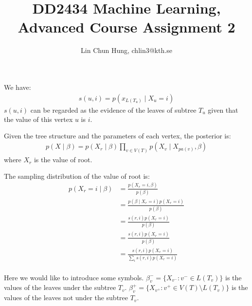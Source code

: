 \documentclass[12pt]{article}
\newenvironment{problem}[2][Problem]{\begin{trivlist}
\item[\hskip \labelsep {\bfseries #1}\hskip \labelsep {\bfseries #2.}]}{\end{trivlist}}
\begin{document}
 
 
\title{DD2434 Machine Learning, Advanced Course Assignment 2}
\author{Lin Chun Hung, chlin3@kth.se}
\maketitle
\begin{problem}{2.5.15}

We have:
\begin{align*}
    s(u, i) = p(x_{L(T_u)} \mid X_u = i)
\end{align*}
$s(u,i)$ can be regarded as the evidence of the leaves of subtree $T_u$ given that
the value of this vertex $u$ is $i$.

Given the tree structure and the parameters of each vertex, the posterior is:
\begin{align*}
    p(X\mid \beta) = p(X_r\mid \beta)\prod_{v\in V(T)} p(X_v\mid X_{pa(v)}, \beta)
\end{align*}
where $X_r$ is the value of root.

The sampling distribution of the value of root is:
\begin{align*}
    p(X_r = i\mid \beta) &= \frac{p(X_r = i, \beta)}{p(\beta)} \\
    &= \frac{p(\beta \mid X_r =i)p(X_r =i)}{p(\beta)} \\
    &= \frac{s(r,i)p(X_r =i)}{p(\beta)} \\
    &= \frac{s(r,i)p(X_r =i)}{p(\beta)} \\
    &= \frac{s(r,i)p(X_r =i)}{\sum_{i}s(r,i)p(X_r =i)} \\
\end{align*}

Here we would like to introduce some symbols. 
$\beta^{-}_{v} = \{X_{v^{-}}: v^{-} \in L(T_v)\}$ is the values of the leaves
under the subtree $T_v$.
$\beta^{+}_{v} = \{X_{v^{+}}: v^{+} \in V(T) \setminus L(T_v)\}$ is the values of
the leaves not under the subtree $T_v$.


\end{problem}
\end{document}
